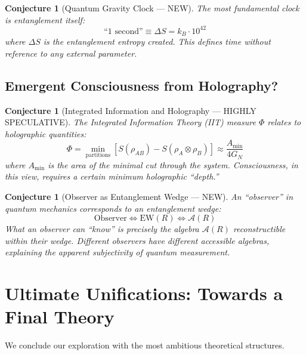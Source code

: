 \documentclass[12pt,a4paper]{article}
\newtheorem{conjecture}[theorem]{Conjecture}
\begin{document}
\begin{conjecture}[Quantum Gravity Clock --- NEW]
The most fundamental clock is entanglement itself:
\begin{equation}
\text{``1 second''} \equiv \Delta S = k_B \cdot 10^{42}
\end{equation}
where $\Delta S$ is the entanglement entropy created. This defines time without reference to any external parameter.
\end{conjecture}

\subsection{Emergent Consciousness from Holography?}

\begin{conjecture}[Integrated Information and Holography --- HIGHLY SPECULATIVE]
The Integrated Information Theory (IIT) measure $\Phi$ relates to holographic quantities:
\begin{equation}
\Phi = \min_{\text{partitions}} \left[ S(\rho_{AB}) - S(\rho_A \otimes \rho_B) \right] \approx \frac{A_{\text{min}}}{4G_N}
\end{equation}
where $A_{\text{min}}$ is the area of the minimal cut through the system. Consciousness, in this view, requires a certain minimum holographic ``depth.''
\end{conjecture}

\begin{conjecture}[Observer as Entanglement Wedge --- NEW]
An ``observer'' in quantum mechanics corresponds to an entanglement wedge:
\begin{equation}
\text{Observer} \Leftrightarrow \text{EW}(R) \Leftrightarrow \mathcal{A}(R)
\end{equation}
What an observer can ``know'' is precisely the algebra $\mathcal{A}(R)$ reconstructible within their wedge. Different observers have different accessible algebras, explaining the apparent subjectivity of quantum measurement.
\end{conjecture}

\section{Ultimate Unifications: Towards a Final Theory}

We conclude our exploration with the most ambitious theoretical structures.
\end{document}
